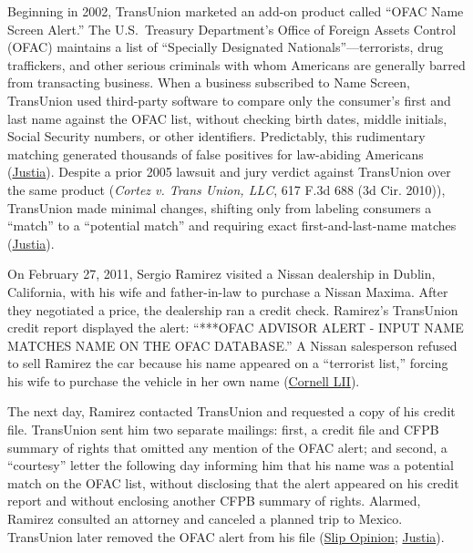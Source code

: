 \documentclass[12pt]{article}
\begin{document}
Beginning in 2002, TransUnion marketed an add-on product called ``OFAC Name Screen Alert.'' The U.S.~Treasury Department's Office of Foreign Assets Control (OFAC) maintains a list of ``Specially Designated Nationals''---terrorists, drug traffickers, and other serious criminals with whom Americans are generally barred from transacting business. When a business subscribed to Name Screen, TransUnion used third-party software to compare only the consumer's first and last name against the OFAC list, without checking birth dates, middle initials, Social Security numbers, or other identifiers. Predictably, this rudimentary matching generated thousands of false positives for law-abiding Americans (\href{https://supreme.justia.com/cases/federal/us/594/20-297/}{Justia}). Despite a prior 2005 lawsuit and jury verdict against TransUnion over the same product (\textit{Cortez v. Trans Union, LLC}, 617 F.3d 688 (3d Cir. 2010)), TransUnion made minimal changes, shifting only from labeling consumers a ``match'' to a ``potential match'' and requiring exact first-and-last-name matches (\href{https://supreme.justia.com/cases/federal/us/594/20-297/}{Justia}).

On February 27, 2011, Sergio Ramirez visited a Nissan dealership in Dublin, California, with his wife and father-in-law to purchase a Nissan Maxima. After they negotiated a price, the dealership ran a credit check. Ramirez's TransUnion credit report displayed the alert: ``***OFAC ADVISOR ALERT - INPUT NAME MATCHES NAME ON THE OFAC DATABASE.'' A Nissan salesperson refused to sell Ramirez the car because his name appeared on a ``terrorist list,'' forcing his wife to purchase the vehicle in her own name (\href{https://www.law.cornell.edu/supremecourt/text/20-297}{Cornell LII}).

The next day, Ramirez contacted TransUnion and requested a copy of his credit file. TransUnion sent him two separate mailings: first, a credit file and CFPB summary of rights that omitted any mention of the OFAC alert; and second, a ``courtesy'' letter the following day informing him that his name was a potential match on the OFAC list, without disclosing that the alert appeared on his credit report and without enclosing another CFPB summary of rights. Alarmed, Ramirez consulted an attorney and canceled a planned trip to Mexico. TransUnion later removed the OFAC alert from his file (\href{https://www.supremecourt.gov/opinions/20pdf/20-297_4g25.pdf}{Slip Opinion}; \href{https://supreme.justia.com/cases/federal/us/594/20-297/}{Justia}).
\end{document}
